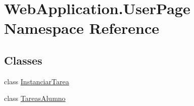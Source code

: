 \hypertarget{namespaceWebApplication_1_1UserPage}{}\section{Web\+Application.\+User\+Page Namespace Reference}
\label{namespaceWebApplication_1_1UserPage}
\subsection*{Classes}
\begin{DoxyCompactItemize}
\item 
class \mbox{\hyperlink{classWebApplication_1_1UserPage_1_1InstanciarTarea}{Instanciar\+Tarea}}
\item 
class \mbox{\hyperlink{classWebApplication_1_1UserPage_1_1TareasAlumno}{Tareas\+Alumno}}
\end{DoxyCompactItemize}
